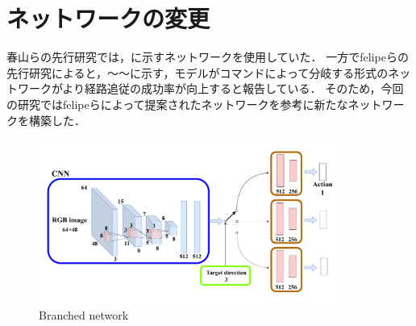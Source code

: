 \section{ネットワークの変更}
春山らの先行研究では，に示すネットワークを使用していた．
一方でfelipeらの先行研究によると，～～に示す，モデルがコマンドによって分岐する形式のネットワークがより経路追従の成功率が向上すると報告している．
そのため，今回の研究ではfelipeらによって提案されたネットワークを参考に新たなネットワークを構築した．

\begin{figure}[htbp]
  \centering
   \includegraphics[width=100mm]{images/pdf/ishiguro/branched.pdf}
   \caption{Branched network}
   \label{fig:branched}
\end{figure}